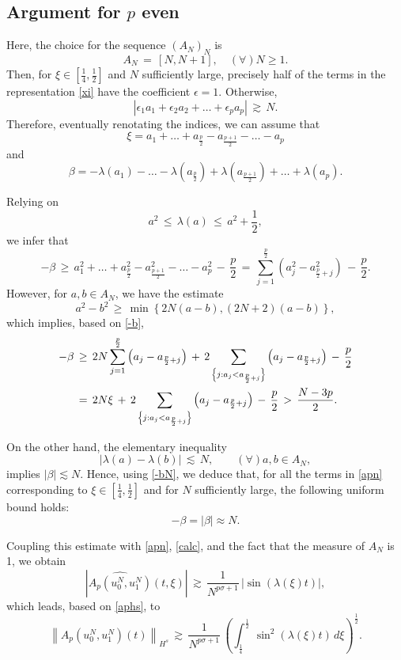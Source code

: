 \documentclass{amsart}
\begin{document}
\subsection{Argument for $p$ even}
Here, the choice for the sequence $(A_N)_N$ is 
\[
A_N\,=\,[N,N+1], \quad (\forall) N \geq 1.
\]
Then, for $\xi \in \left[\frac{1}{4},\frac{1}{2}\right]$ and $N$ sufficiently large, precisely half of the terms in the representation \eqref{xi} have the coefficient $\epsilon =1$. Otherwise,
\[
\left|\epsilon_1 a_1+\epsilon_2 a_2+ \ldots+\epsilon_p a_p\right|\,\gtrsim\,N.\]
Therefore, eventually renotating the indices, we can assume that
\[
\xi=a_1+ \ldots+ a_{\frac p2} - a_{\frac{p+1}{2}}-\ldots-a_p 
\]
and 
\[
\beta=-\lambda(a_1)- \ldots- \lambda(a_{\frac p2}) + \lambda(a_{\frac{p+1}{2}})+\ldots+ \lambda(a_p). 
\]

Relying on 
\[
a^2\,\leq\,\lambda (a)\,\leq\, a^2 +\frac 12,
\]
we infer that
\begin{equation}
-\beta\,\geq\, a^2_1+ \ldots+ a^2_{\frac p2} - a^2_{\frac{p+1}{2}}-\ldots-a^2_p\,-\,\frac p2\,=\,\sum_{j=1}^{\frac p2} \left(a^2_j-a^2_{\frac{p}{2}+j}\right)\,-\,\frac p2. 
\label{-b}
\end{equation}
However, for $a,b \in A_N$, we have the estimate
\[
a^2-b^2\,\geq\,\min\left\{ 2N(a-b),(2N+2)(a-b)\right\},
\]
which implies, based on \eqref{-b},
\begin{equation}
\aligned
-\beta\,&\geq\, 2N \sum_{j=1}^{\frac p2} \left(a_j-a_{\frac{p}{2}+j}\right)\,+\, 2 \sum_{\left\{j: a_j< a_{\frac{p}{2}+j}\right\}} \left(a_j-a_{\frac{p}{2}+j}\right)\,-\,\frac p2\\
&=\,2N\xi\,+\, 2 \sum_{\left\{j: a_j< a_{\frac{p}{2}+j}\right\}} \left(a_j-a_{\frac{p}{2}+j}\right)\,-\,\frac p2\,>\,\frac{N-3p}{2}.\endaligned
\label{-bN}
\end{equation}

On the other hand, the elementary inequality
\[
\left|\lambda(a)-\lambda(b)\right|\,\lesssim \,N, \qquad (\forall) a,b \in A_N, 
\]
implies $|\beta|\lesssim N$. Hence, using \eqref{-bN}, we deduce that, for all the terms in \eqref{apn} corresponding to $\xi \in \left[\frac{1}{4},\frac{1}{2}\right]$ and for $N$ sufficiently large, the following uniform bound holds:
\begin{equation}
-\beta= |\beta| \approx N.
\label{beven}
\end{equation}

Coupling this estimate with \eqref{apn}, \eqref{calc}, and the fact that the measure of $A_N$ is 1, we obtain
\[
\left|\widehat{A_p(u^N_0,u^N_1)}(t,\xi)\right|\,\gtrsim\,\frac{1}{N^{p\sigma+1}}\,|\sin(\lambda(\xi)t)|,
\]  
which leads, based on \eqref{aphs}, to
\begin{equation}
\left\|A_{p}\left(u_0^N,u_1^N\right)(t)\right\|_{H^s}\,\gtrsim\,  \frac{1}{N^{p\sigma+1}}\, \left(\int_\frac{1}{4}^\frac{1}{2}\,\sin^2(\lambda(\xi)t)\,d\xi\right)^\frac{1}{2}.
\label{aphs2}
\end{equation} 
\end{document}

